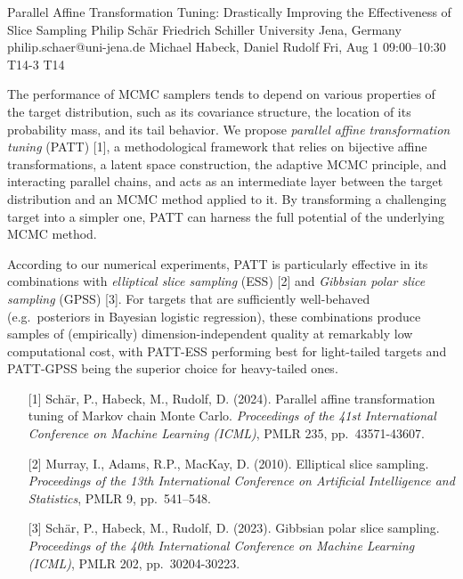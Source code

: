 \begin{talk}
\end{talk}

\begin{talk}
  {Parallel Affine Transformation Tuning: Drastically Improving the Effectiveness of Slice Sampling}%
  {Philip Schär}%
  {Friedrich Schiller University Jena, Germany}%
  {philip.schaer@uni-jena.de}%
  {Michael Habeck, Daniel Rudolf}%
  {}%
  {Fri, Aug 1 09:00–10:30}%
  {T14-3}%
  {T14}%
  

The performance of MCMC samplers tends to depend on various properties of the target distribution, such as its covariance structure, the location of its probability mass, and its tail behavior. We propose \textit{parallel affine transformation tuning} (PATT) [1], a methodological framework that relies on bijective affine transformations, a latent space construction, the adaptive MCMC principle, and interacting parallel chains, and acts as an intermediate layer between the target distribution and an MCMC method applied to it. By transforming a challenging target into a simpler one, PATT can harness the full potential of the underlying MCMC method.

According to our numerical experiments, PATT is particularly effective in its combinations with \textit{elliptical slice sampling} (ESS) [2] and \textit{Gibbsian polar slice sampling} (GPSS) [3]. For targets that are sufficiently well-behaved (e.g.~posteriors in Bayesian logistic regression), these combinations produce samples of (empirically) dimension-independent quality at remarkably low computational cost, with PATT-ESS performing best for light-tailed targets and PATT-GPSS being the superior choice for heavy-tailed ones.

\medskip

\begin{enumerate}
	\item[{[1]}] Schär, P., Habeck, M., Rudolf, D. (2024). Parallel affine transformation tuning of Markov chain Monte Carlo. \textit{Proceedings of the 41st International Conference on Machine Learning (ICML)}, PMLR 235, pp.~43571-43607.
	\item[{[2]}] Murray, I., Adams, R.P., MacKay, D. (2010). Elliptical slice sampling. \textit{Proceedings of the 13th International Conference on Artificial Intelligence and Statistics}, PMLR 9, pp.~541--548.
	\item[{[3]}] Schär, P., Habeck, M., Rudolf, D. (2023). Gibbsian polar slice sampling. \textit{Proceedings of the 40th International Conference on Machine Learning (ICML)}, PMLR 202, pp.~30204-30223.
\end{enumerate}

\end{talk}

